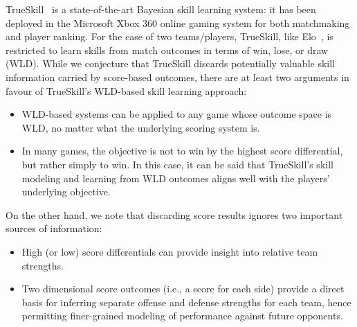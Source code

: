 \documentclass[runningheads,a4paper]{llncs}
\begin{document}
TrueSkill~\cite{herbrich06569} is a state-of-the-art Bayesian skill
learning system: it has been deployed in the Microsoft Xbox 360 online
gaming system for both matchmaking and player ranking.  For the case
of two teams/players, TrueSkill, like
Elo~\cite{elo78TheRatingOfChessPlayers}, is restricted to learn skills
from match outcomes in terms of win, lose, or draw (WLD).
While we conjecture that TrueSkill discards potentially
valuable skill information carried by score-based outcomes,
there are at least two arguments in favour of TrueSkill's WLD-based
skill learning approach:
\begin{itemize}
\item WLD-based systems can be applied to any game whose outcome space
is WLD, no matter what the underlying scoring system is.
\item In many games, the objective is not to win by the highest
score differential, but rather simply to win.  In this case,
it can be said that TrueSkill's skill modeling and learning from WLD
outcomes aligns well with the players' underlying objective.
\end{itemize}
On the other hand, we note that discarding score results
ignores two important sources of information:
\begin{itemize}
\item High (or low) score
differentials can provide insight into relative team strengths.
\item Two dimensional score outcomes (i.e., a score for each side) provide a
direct basis for inferring separate offense and defense strengths for
each team, hence permitting finer-grained modeling of performance against
future opponents.
\end{itemize}
\end{document}
